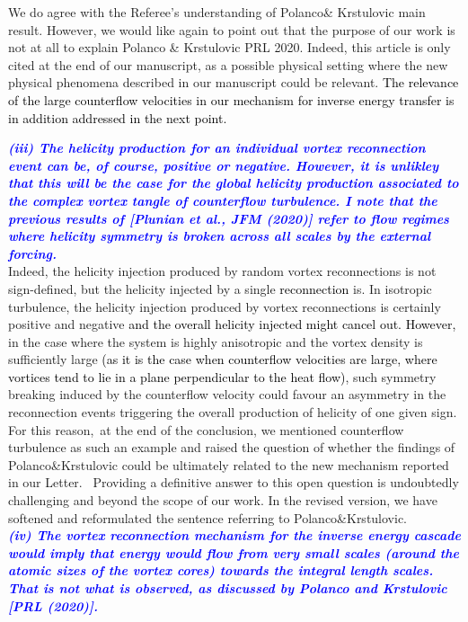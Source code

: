 \documentclass[a4paper,10pt]{article}
\def\red#1{\textcolor{black}{#1}}
\def\blue#1{\textcolor{blue}{#1}}
\def\refcomment#1{\textbf{\blue{\emph{#1}}}\\}
\begin{document}
We do agree with the Referee’s understanding of Polanco\& Krstulovic main result. 
However, we would like again to point out that the purpose of our work is not at all to explain Polanco \& Krstulovic PRL 2020. Indeed, this article is only cited at the end of our manuscript, as a possible physical setting where the new physical phenomena described in our manuscript could be relevant. \red{The relevance of the large counterflow velocities in our mechanism for inverse energy transfer is in addition addressed in the next point.}
 


\refcomment{(iii) The helicity production for an individual vortex reconnection event can be, of course, positive or negative. However, it is unlikley that this will be the case for the global helicity production associated to the complex vortex tangle of counterflow turbulence. I note that the previous results of [Plunian et al., JFM (2020)] refer to flow regimes where helicity symmetry is broken across all scales by the external forcing.}

Indeed, the helicity injection produced by random vortex reconnections 
is not sign-defined, but the helicity injected by a single \red{reconnection}
is.  In isotropic turbulence, the helicity injection produced by vortex reconnections is certainly positive and negative \red{and the overall helicity injected
might cancel out. However,} in the case where the system is highly anisotropic and the vortex density is sufficiently large \red{(as it is the case when counterflow velocities are large, where vortices tend to lie in a plane perpendicular to the heat flow)}, such symmetry breaking induced by the counterflow velocity could favour an asymmetry in the reconnection events triggering the overall production of helicity of one given sign. For this reason, at the end of the conclusion, we mentioned counterflow turbulence as such an example and raised the question of whether the findings of Polanco\&Krstulovic could be ultimately related to the new mechanism reported in our Letter.  Providing a definitive answer to this open question is undoubtedly challenging and beyond the scope of our work. In the revised version, we have softened and reformulated the sentence referring to Polanco\&Krstulovic.\\

\refcomment{(iv) The vortex reconnection mechanism for the inverse energy cascade would imply that energy would flow from very small scales (around the atomic sizes of the vortex cores) towards the integral length scales. That is not what is observed, as discussed by Polanco and Krstulovic [PRL (2020)].}
\end{document}
